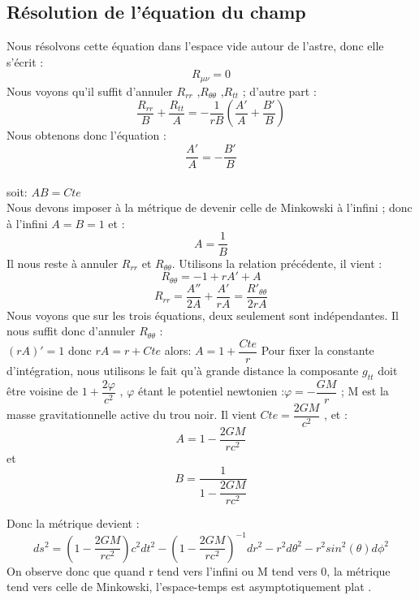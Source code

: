 \documentclass[12pt,  a4paper, openright]{report} %
\begin{document}
\subsection*{Résolution de l’équation du champ}
Nous résolvons cette équation dans l’espace vide autour de l’astre, donc elle s’écrit :\\
$$R_{\mu\nu}=0$$
Nous voyons qu’il suffit d’annuler $R_{rr}$ ,$ R_{\theta\theta}$ ,$R_{tt}$ ; d’autre part :\\
$$\dfrac{R_{rr}}{B}+\dfrac{R_{tt}}{A}=-\dfrac{1}{rB} \left(\dfrac{A'}{A}+\dfrac{B'}{B} \right)$$
Nous obtenons donc l’équation :\\
$$\dfrac{A'}{A}=-\dfrac{B'}{B}$$\\
soit: $AB=Cte$\\
Nous devons imposer à la métrique de devenir celle de Minkowski à l’infini ; donc à l’infini $A= B = 1$ et :
$$A=\dfrac{1}{B}$$
Il nous reste à annuler $R_{rr}$ et $R_{\theta\theta}$. Utilisons la relation précédente, il vient :\\
$$R_{\theta\theta}=-1+rA'+A$$
$$R_{rr}=\dfrac{A''}{2A}+\dfrac{A'}{rA}=\dfrac{R'_{\theta\theta}}{2rA}$$
Nous voyons que sur les trois équations, deux seulement sont indépendantes. Il nous suffit donc d’annuler $R_{\theta\theta}$ :\\
$(rA)'=1 $ donc $rA=r+Cte $ alors: $A=1+\dfrac{Cte}{r}$
Pour fixer la constante d’intégration, nous utilisons le fait qu’à grande distance la composante $g_{tt}$ doit être voisine de $1 + \dfrac{2\varphi}{c^{2}}$ , $\varphi$ étant le potentiel newtonien :$ \varphi=-\dfrac{GM}{r}$ ; M est la masse
gravitationnelle active du trou noir. Il vient $ Cte = \dfrac{2GM}{c^{2}}$ , et :
\begin{equation}
A=1-\dfrac{2GM}{rc^{2}}
\end{equation}
et
\begin{equation}
B=\dfrac{1}{1-\dfrac{2GM}{rc^{2}}}
\end{equation}  


Donc la métrique devient :
\begin{equation}
ds^{2}=\left(1 -\dfrac{2GM}{rc^{2}} \right) c^{2}dt^{2}- \left(1 -\dfrac{2GM}{rc^{2}} \right)^{-1}dr^{2}-r^{2}d\theta^{2}-r^{2}sin^{2}(\theta) d\phi^{2}
\end{equation}
On observe donc que quand r tend vers l’infini ou M tend vers 0, la métrique tend vers celle
de Minkowski, l’espace-temps est asymptotiquement plat \cite{8} .
\end{document}
